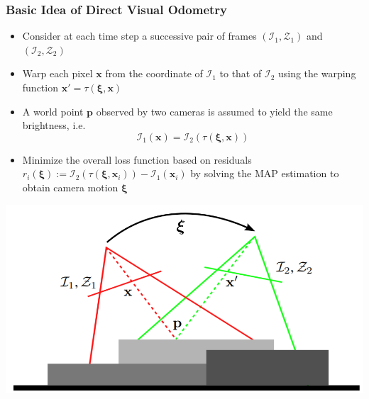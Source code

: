 \begin{frame}
\frametitle{Basic Idea of Direct Visual Odometry}

\vspace{1.5em}
\begin{multicols}{2}
    \begin{itemize}
        \item Consider at each time step a successive pair of frames $(\mathcal{I}_1, \mathcal{Z}_1)$ and $(\mathcal{I}_2, \mathcal{Z}_2)$
        \vspace{0.5em}\item Warp each pixel $\mathbf{x}$ from the coordinate of $\mathcal{I}_1$ to that of $\mathcal{I}_2$ using the warping function $\mathbf{x}' = \tau(\boldsymbol{\xi}, \mathbf{x})$
        \vspace{0.5em}\item A world point $\mathbf{p}$ observed by two cameras is assumed to yield the same brightness, i.e. $$\mathcal{I}_{1}(\mathbf{x}) = \mathcal{I}_{2}(\tau(\boldsymbol{\xi}, \mathbf{x}))$$
        \vfill \item Minimize the overall loss function based on residuals $r_i(\boldsymbol{\xi}) := \mathcal{I}_2\left(\tau\left(\boldsymbol{\xi}, \mathbf{x}_i\right)\right)-\mathcal{I}_1\left(\mathbf{x}_i\right)$ by solving the MAP estimation to obtain camera motion $\boldsymbol{\xi}$
        
    \end{itemize}
    \vfill\columnbreak
    \includegraphics[width=\columnwidth]{Bilder/warping.png}%
\end{multicols}

\end{frame}
\clearpage



